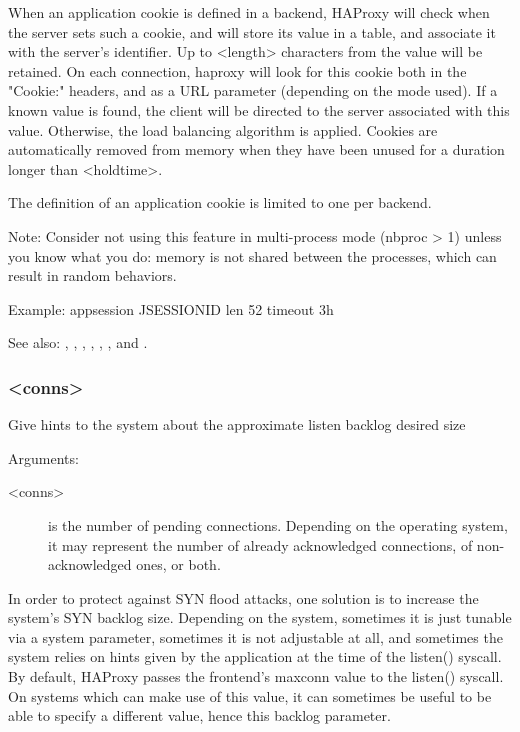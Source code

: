   When an application cookie is defined in a backend, HAProxy will check when
  the server sets such a cookie, and will store its value in a table, and
  associate it with the server's identifier. Up to <length> characters from
  the value will be retained. On each connection, haproxy will look for this
  cookie both in the "Cookie:" headers, and as a URL parameter (depending on
  the mode used). If a known value is found, the client will be directed to the
  server associated with this value. Otherwise, the load balancing algorithm is
  applied. Cookies are automatically removed from memory when they have been
  unused for a duration longer than <holdtime>.

  The definition of an application cookie is limited to one per backend.

  \begin{note}{Note:}
         Consider not using this feature in multi-process mode (nbproc > 1)
         unless you know what you do: memory is not shared between the
         processes, which can result in random behaviors.
  \end{note}
  
  \begin{example}{Example:}
  appsession JSESSIONID len 52 timeout 3h
  \end{example}


See also: , , , ,
  , ,  and .

\subsubsection[backlog]{ <conns>}

  Give hints to the system about the approximate listen backlog desired size
 
  
  Arguments:
  \begin{description}
  \item[<conns>]
         is the number of pending connections. Depending on the operating
              system, it may represent the number of already acknowledged
              connections, of non-acknowledged ones, or both.
  \end{description}

  In order to protect against SYN flood attacks, one solution is to increase
  the system's SYN backlog size. Depending on the system, sometimes it is just
  tunable via a system parameter, sometimes it is not adjustable at all, and
  sometimes the system relies on hints given by the application at the time of
  the listen() syscall. By default, HAProxy passes the frontend's maxconn value
  to the listen() syscall. On systems which can make use of this value, it can
  sometimes be useful to be able to specify a different value, hence this
  backlog parameter.

